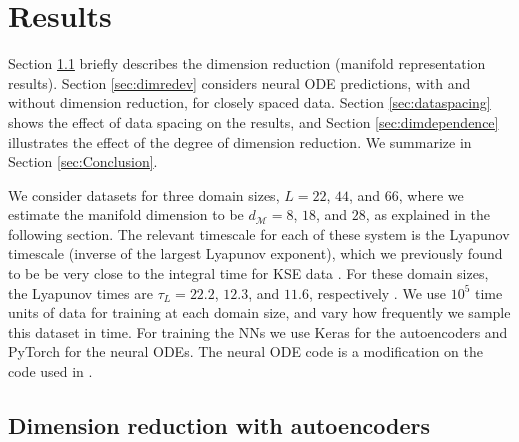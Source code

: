 \documentclass[preprint,aps,pre,letterpaper,onecolumn,superscriptaddress]{revtex4-2} %
\begin{document}
\section{Results} \label{sec:Results}

Section \ref{sec:autoencoders} briefly describes the dimension reduction (manifold representation results).  Section \ref{sec:dimredev} considers neural ODE predictions, with and without dimension reduction, for closely spaced data. Section \ref{sec:dataspacing} shows the effect of data spacing on the results, and Section \ref{sec:dimdependence} illustrates the effect of the degree of dimension reduction. We summarize in Section \ref{sec:Conclusion}.


We consider datasets for three domain sizes, $L=22$, $44$, and $66$, where we estimate the manifold dimension to be $d_\mathcal{M}=8$, $18$, and $28$, as explained in the following section. The relevant timescale for each of these system is the Lyapunov timescale (inverse of the largest Lyapunov exponent), which we previously found to be be very close to the integral time for KSE data \cite{Linot2020}. For these domain sizes, the Lyapunov times are $\tau_L=22.2$, $12.3$, and $11.6$, respectively \cite{Ding2016,Edson2019}. We use $10^5$ time units of data for training at each domain size, and vary how frequently we sample this dataset in time. 
For training the NNs we use Keras \cite{chollet2015keras} for the autoencoders and PyTorch \cite{Paszke2019} for the neural ODEs. The neural ODE code is a modification on the code used in \cite{Chen2019}.

\subsection{Dimension reduction with autoencoders}\label{sec:autoencoders}
\end{document}
